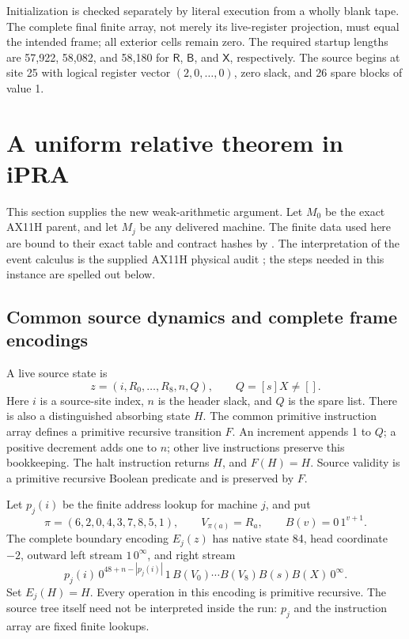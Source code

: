 \documentclass[11pt]{article}
\newcommand{\R}{\ensuremath{\mathsf R}}
\newcommand{\B}{\ensuremath{\mathsf B}}
\newcommand{\X}{\ensuremath{\mathsf X}}
\newcommand{\file}[1]{\path{#1}}
\begin{document}
Initialization is checked separately by literal execution from a wholly
blank tape. The complete final finite array, not merely its live-register
projection, must equal the intended frame; all exterior cells remain
zero. The required startup lengths are 57,922, 58,082, and 58,180 for
\R, \B, and \X, respectively. The source begins at site 25 with
logical register vector $(2,0,\ldots,0)$, zero slack, and 26 spare
blocks of value 1.

\section{A uniform relative theorem in iPRA}
\label{sec:relative}

This section supplies the new weak-arithmetic argument. Let $M_0$
be the exact AX11H parent, and let $M_j$ be any delivered machine.
The finite data used here are bound to their exact table and contract
hashes by \file{proof/check_clocks.py}. The interpretation of the event
calculus is the supplied AX11H physical audit \cite{calibration}; the
steps needed in this instance are spelled out below.

\subsection{Common source dynamics and complete frame encodings}

A live source state is
\[
 z=(i,R_0,\ldots,R_8,n,Q),\qquad Q=[s]X\ne[].
\]
Here $i$ is a source-site index, $n$ is the header slack, and $Q$ is
the spare list. There is also a distinguished absorbing state $H$.
The common primitive instruction array defines a primitive recursive
transition $F$. An increment appends 1 to $Q$; a positive decrement
adds one to $n$; other live instructions preserve this bookkeeping.
The halt instruction returns $H$, and $F(H)=H$. Source validity is
a primitive recursive Boolean predicate and is preserved by $F$.

Let $p_j(i)$ be the finite address lookup for machine $j$, and put
\[
 \pi=(6,2,0,4,3,7,8,5,1),\qquad V_{\pi(a)}=R_a,
 \qquad B(v)=0\,1^{v+1}.
\]
The complete boundary encoding $E_j(z)$ has native state 84,
head coordinate $-2$, outward left stream $1\,0^\infty$, and right
stream
\[
 p_j(i)\,0^{48+n-|p_j(i)|}\,1\,
 B(V_0)\cdots B(V_8) B(s)B(X)\,0^\infty.
 \tag{1}\label{eq:frame}
\]
Set $E_j(H)=H$. Every operation in this encoding is primitive recursive.
The source tree itself need not be interpreted inside the run: $p_j$
and the instruction array are fixed finite lookups.
\end{document}
